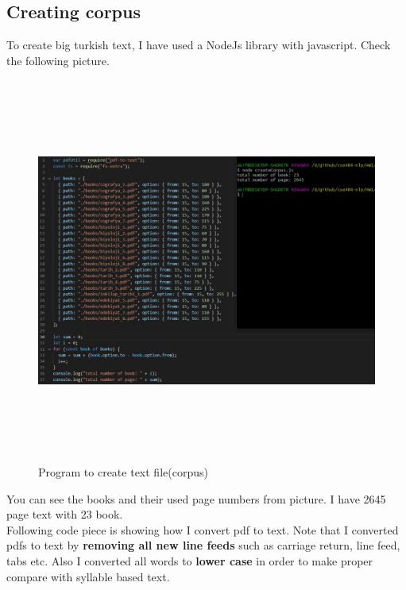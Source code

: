 \documentclass{article}
\begin{document}
\subsection{Creating corpus}
To create big turkish text, I have used a NodeJs library with javascript. Check the following picture.
\begin{figure}[H]
    \centering
	\includegraphics[width=7in, height=5in]{3.JPG}
	\caption[Optional caption]{Program to create text file(corpus)}
	\label{}
\end{figure}
You can see the books and their used page numbers from picture. I have 2645 page text with 23 book. \\
\newline
Following code piece is showing how I convert pdf to text. Note that I converted pdfs to
text by \textbf{removing all new line feeds} such as carriage return, line feed, tabs etc. Also I converted all words to \textbf{lower case} in order to make proper compare with syllable based text.
\cleardoublepage
\end{document}
